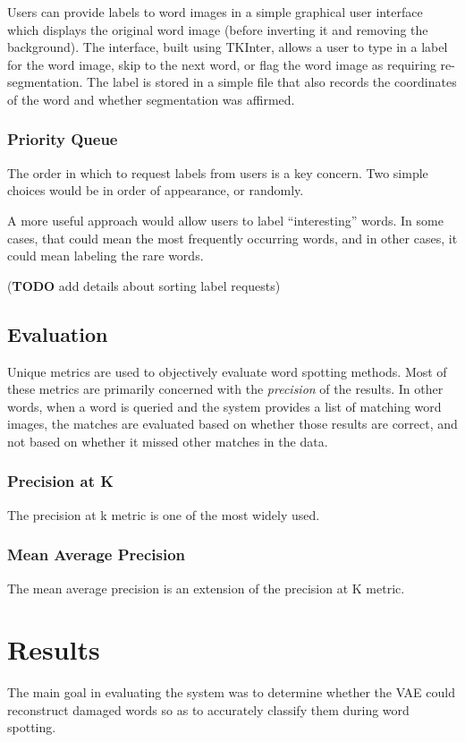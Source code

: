 \documentclass[final]{ukthesis}
\begin{document}
Users can provide labels to word images in a simple graphical user interface which displays the original word image (before inverting it and removing the background). The interface, built using TKInter, allows a user to type in a label for the word image, skip to the next word, or flag the word image as requiring re-segmentation. The label is stored in a simple file that also records the coordinates of the word and whether segmentation was affirmed.

\subsection{Priority Queue}
The order in which to request labels from users is a key concern. Two simple choices would be in order of appearance, or randomly.

A more useful approach would allow users to label ``interesting'' words. In some cases, that could mean the most frequently occurring words, and in other cases, it could mean labeling the rare words.

(\textbf{TODO} add details about sorting label requests)


%
%
\section{Evaluation}
Unique metrics are used to objectively evaluate word spotting methods. Most of these metrics are primarily concerned with the {\em precision} of the results. In other words, when a word is queried and the system provides a list of matching word images, the matches are evaluated based on whether those results are correct, and not based on whether it missed other matches in the data.

\subsection{Precision at K}
The precision at k metric is one of the most widely used.

\subsection{Mean Average Precision}
The mean average precision is an extension of the precision at K metric.



%
%
%
\chapter{Results}
The main goal in evaluating the system was to determine whether the VAE could reconstruct damaged words so as to accurately classify them during word spotting.
\end{document}
